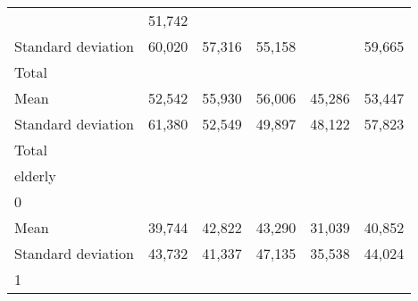 \begin{tabular}{llllll}
  \multicolumn{1}{r}{} &
  \multicolumn{1}{r}{51,742} \\
\multicolumn{1}{l}{\hspace{4em}Standard deviation} &
  \multicolumn{1}{|r}{60,020} &
  \multicolumn{1}{r}{57,316} &
  \multicolumn{1}{r}{55,158} &
  \multicolumn{1}{r}{} &
  \multicolumn{1}{r}{59,665} \\
\multicolumn{1}{l}{\hspace{3em}Total} &
  \multicolumn{1}{|r}{} &
  \multicolumn{1}{r}{} &
  \multicolumn{1}{r}{} &
  \multicolumn{1}{r}{} &
  \multicolumn{1}{r}{} \\
\multicolumn{1}{l}{\hspace{4em}Mean} &
  \multicolumn{1}{|r}{52,542} &
  \multicolumn{1}{r}{55,930} &
  \multicolumn{1}{r}{56,006} &
  \multicolumn{1}{r}{45,286} &
  \multicolumn{1}{r}{53,447} \\
\multicolumn{1}{l}{\hspace{4em}Standard deviation} &
  \multicolumn{1}{|r}{61,380} &
  \multicolumn{1}{r}{52,549} &
  \multicolumn{1}{r}{49,897} &
  \multicolumn{1}{r}{48,122} &
  \multicolumn{1}{r}{57,823} \\
\multicolumn{1}{l}{\hspace{1em}Total} &
  \multicolumn{1}{|r}{} &
  \multicolumn{1}{r}{} &
  \multicolumn{1}{r}{} &
  \multicolumn{1}{r}{} &
  \multicolumn{1}{r}{} \\
\multicolumn{1}{l}{\hspace{2em}elderly} &
  \multicolumn{1}{|r}{} &
  \multicolumn{1}{r}{} &
  \multicolumn{1}{r}{} &
  \multicolumn{1}{r}{} &
  \multicolumn{1}{r}{} \\
\multicolumn{1}{l}{\hspace{3em}0} &
  \multicolumn{1}{|r}{} &
  \multicolumn{1}{r}{} &
  \multicolumn{1}{r}{} &
  \multicolumn{1}{r}{} &
  \multicolumn{1}{r}{} \\
\multicolumn{1}{l}{\hspace{4em}Mean} &
  \multicolumn{1}{|r}{39,744} &
  \multicolumn{1}{r}{42,822} &
  \multicolumn{1}{r}{43,290} &
  \multicolumn{1}{r}{31,039} &
  \multicolumn{1}{r}{40,852} \\
\multicolumn{1}{l}{\hspace{4em}Standard deviation} &
  \multicolumn{1}{|r}{43,732} &
  \multicolumn{1}{r}{41,337} &
  \multicolumn{1}{r}{47,135} &
  \multicolumn{1}{r}{35,538} &
  \multicolumn{1}{r}{44,024} \\
\multicolumn{1}{l}{\hspace{3em}1} &
  \multicolumn{1}{|r}{} &

\end{tabular}
